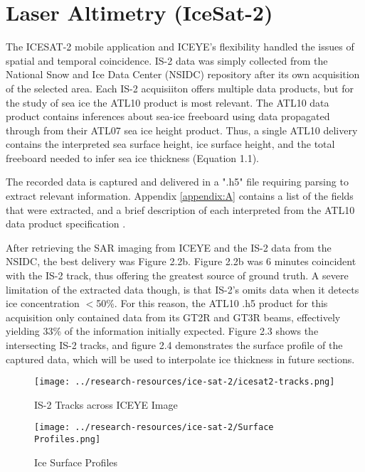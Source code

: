 \section {Laser Altimetry (IceSat-2)}
The ICESAT-2 mobile application and ICEYE's flexibility handled the issues of spatial and temporal coincidence. IS-2 data was simply collected from the National Snow and Ice Data Center (NSIDC) repository after its own acquisition of the selected area. Each IS-2 acquisiiton offers multiple data products, but for the study of sea ice the ATL10 product is most relevant. The ATL10 data product contains inferences about sea-ice freeboard using data propagated through from their ATL07 sea ice height product. Thus, a single ATL10 delivery contains the interpreted sea surface height, ice surface height, and the total freeboard \cite{ICESat-2-ATL10-Product} needed to infer sea ice thickness (Equation 1.1).

The recorded data is captured and delivered in a ".h5" file requiring parsing to extract relevant information. Appendix \ref{appendix:A} contains a list of the fields that were extracted, and a brief description of each interpreted from the ATL10 data product specification \cite*{ICESat-2-ATL10-Product}.

After retrieving the SAR imaging from ICEYE and the IS-2 data from the NSIDC, the best delivery was Figure 2.2b. Figure 2.2b was 6 minutes coincident with the IS-2 track, thus offering the greatest source of ground truth. A severe limitation of the extracted data though, is that IS-2's omits data when it detects ice concentration $<$50\%. For this reason, the ATL10 .h5 product for this acquisition only contained data from its GT2R and GT3R beams, effectively yielding 33\% of the information initially expected. Figure 2.3 shows the intersecting IS-2 tracks, and figure 2.4 demonstrates the surface profile of the captured data, which will be used to interpolate ice thickness in future sections.


\begin{figure}[h!]
	\centering
	\texttt{[image: ../research-resources/ice-sat-2/icesat2-tracks.png]}
	\caption[Overlayed LiDAR and SAR Readings]{IS-2 Tracks across ICEYE Image}
	\label{fig:icesat2-tracks}
\end{figure}

\begin{figure}[h!]
	\centering
	\texttt{[image: ../research-resources/ice-sat-2/Surface Profiles.png]}
	\caption[Ice Surface Profile of Acquired Data]{Ice Surface Profiles}
	\label{fig:ice-thickness-gathered}
\end{figure}

